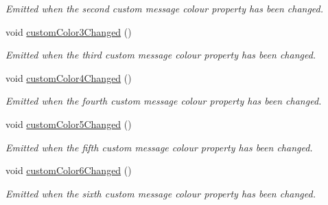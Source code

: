 \begin{DoxyCompactItemize}
\begin{DoxyCompactList}\small\item\em Emitted when the second custom message colour property has been changed. \end{DoxyCompactList}\item 
\hypertarget{class_console_widget_a0eece2c8ac4de3639931b76e82c08196}{void \hyperlink{class_console_widget_a0eece2c8ac4de3639931b76e82c08196}{custom\-Color3\-Changed} ()}\label{class_console_widget_a0eece2c8ac4de3639931b76e82c08196}

\begin{DoxyCompactList}\small\item\em Emitted when the third custom message colour property has been changed. \end{DoxyCompactList}\item 
\hypertarget{class_console_widget_a655f6522aa4bbfc625c3d6f9ffbfe26e}{void \hyperlink{class_console_widget_a655f6522aa4bbfc625c3d6f9ffbfe26e}{custom\-Color4\-Changed} ()}\label{class_console_widget_a655f6522aa4bbfc625c3d6f9ffbfe26e}

\begin{DoxyCompactList}\small\item\em Emitted when the fourth custom message colour property has been changed. \end{DoxyCompactList}\item 
\hypertarget{class_console_widget_a1d2c4dee435697402c0e4b482bd051bc}{void \hyperlink{class_console_widget_a1d2c4dee435697402c0e4b482bd051bc}{custom\-Color5\-Changed} ()}\label{class_console_widget_a1d2c4dee435697402c0e4b482bd051bc}

\begin{DoxyCompactList}\small\item\em Emitted when the fifth custom message colour property has been changed. \end{DoxyCompactList}\item 
\hypertarget{class_console_widget_a8f9b8bb7e73504bbbd80b07cb36381cb}{void \hyperlink{class_console_widget_a8f9b8bb7e73504bbbd80b07cb36381cb}{custom\-Color6\-Changed} ()}\label{class_console_widget_a8f9b8bb7e73504bbbd80b07cb36381cb}

\begin{DoxyCompactList}\small\item\em Emitted when the sixth custom message colour property has been changed. \end{DoxyCompactList}\end{DoxyCompactItemize}
